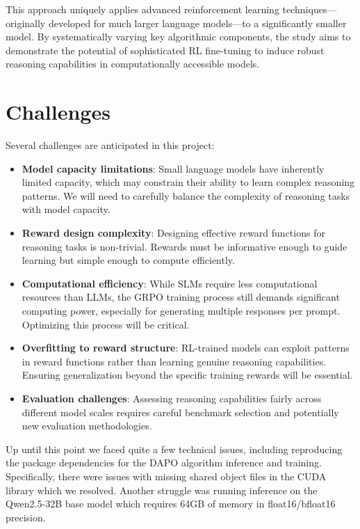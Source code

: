 \documentclass[11pt, oneside]{article}   	%
\begin{document}
This approach uniquely applies advanced reinforcement learning techniques—originally developed for much larger language models—to a significantly smaller model. By systematically varying key algorithmic components, the study aims to demonstrate the potential of sophisticated RL fine-tuning to induce robust reasoning capabilities in computationally accessible models.

\section*{Challenges}

Several challenges are anticipated in this project:

\begin{itemize}
	\item \textbf{Model capacity limitations}: Small language models have inherently limited capacity, which may constrain their ability to learn complex reasoning patterns. We will need to carefully balance the complexity of reasoning tasks with model capacity.

	\item \textbf{Reward design complexity}: Designing effective reward functions for reasoning tasks is non-trivial. Rewards must be informative enough to guide learning but simple enough to compute efficiently.

	\item \textbf{Computational efficiency}: While SLMs require less computational resources than LLMs, the GRPO training process still demands significant computing power, especially for generating multiple responses per prompt. Optimizing this process will be critical.

	\item \textbf{Overfitting to reward structure}: RL-trained models can exploit patterns in reward functions rather than learning genuine reasoning capabilities. Ensuring generalization beyond the specific training rewards will be essential.

	\item \textbf{Evaluation challenges}: Assessing reasoning capabilities fairly across different model scales requires careful benchmark selection and potentially new evaluation methodologies.
\end{itemize}

Up until this point we faced quite a few technical issues, including reproducing the package dependencies for the DAPO algorithm inference and training. Specifically, there were issues with missing shared object files in the CUDA library which we resolved. Another struggle was running inference on the Qwen2.5-32B base model which requires 64GB of memory in float16/bfloat16 precision.
\end{document}
